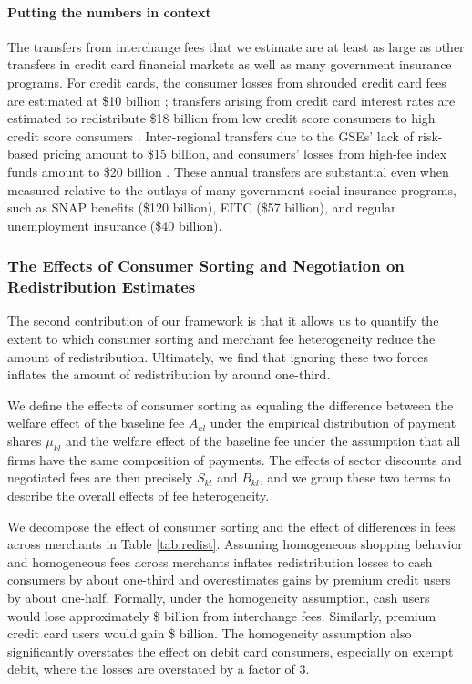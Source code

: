 \documentclass[main.tex]{subfiles}
\begin{document}
\paragraph{Putting the numbers in context}

The transfers from interchange fees that we estimate are at least as large as other transfers in credit card financial markets as well as many government insurance programs.
For credit cards, the consumer losses from shrouded credit card fees are estimated at \$10 billion \citep{agarwal2015regulating,Hurst.etal2016}; transfers arising from credit card interest rates are estimated to redistribute \$18 billion from low credit score consumers to high credit score consumers \citep{Agarwal.etal2022}.
Inter-regional transfers due to the GSEs' lack of risk-based pricing amount to \$15 billion, and consumers' losses from high-fee index funds amount to \$20 billion \citep{agarwal2015regulating,Hurst.etal2016}.
These annual transfers are substantial even when measured relative to the outlays of many government social insurance programs, such as SNAP benefits (\$120 billion), EITC (\$57 billion), and regular unemployment insurance (\$40 billion).

\subsubsection{The Effects of Consumer Sorting and Negotiation on Redistribution Estimates}

The second contribution of our framework is that it allows us to quantify the extent to which consumer sorting and merchant fee heterogeneity reduce the amount of redistribution. Ultimately, we find that ignoring these two forces inflates the amount of redistribution by around one-third.

We define the effects of consumer sorting as equaling the difference between the welfare effect of the baseline fee $A_{kl}$ under the empirical distribution of payment shares $\mu_{kl}$ and the welfare effect of the baseline fee under the assumption that all firms have the same composition of payments.
The effects of sector discounts and negotiated fees are then precisely $S_{kl}$ and $B_{kl}$, and we group these two terms to describe the overall effects of fee heterogeneity.

We decompose the effect of consumer sorting and the effect of differences in fees across merchants in Table \ref{tab:redist}.
Assuming homogeneous shopping behavior and homogeneous fees across merchants inflates redistribution losses to cash consumers by about one-third and overestimates gains by premium credit users by about one-half.
Formally, under the homogeneity assumption, cash users would lose approximately \$ billion from interchange fees.
Similarly, premium credit card users would gain \$ billion.
The homogeneity assumption also significantly overstates the effect on debit card consumers, especially on exempt debit, where the losses are overstated by a factor of 3.
\end{document}
